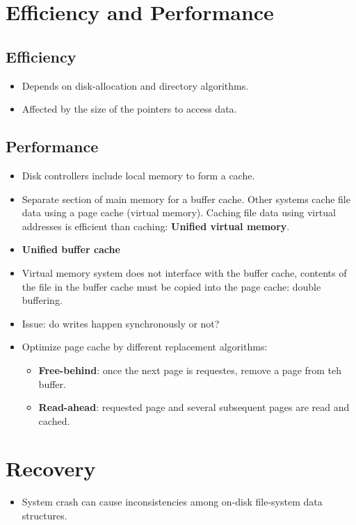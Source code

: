 \documentclass[10pt]{report}
\begin{document}
	\section{Efficiency and Performance}
		\subsection{Efficiency}
			\begin{itemize}
				\item Depends on disk-allocation and directory algorithms.
				\item Affected by the size of the pointers to access data.
			\end{itemize}

		\subsection{Performance}
			\begin{itemize}
				\item Disk controllers include local memory to form a cache.
				\item Separate section of main memory for a buffer cache. Other systems cache file data using a page cache (virtual memory). Caching file data using virtual addresses is efficient than caching: \textbf{Unified virtual memory}.
				\item \textbf{Unified buffer cache}
				\item Virtual memory system does not interface with the buffer cache, contents of the file in the buffer cache must be copied into the page cache: double buffering.
				\item Issue: do writes happen synchronously or not?
				\item Optimize page cache by different replacement algorithms:
				\begin{itemize}
					\item \textbf{Free-behind}: once the next page is requestes, remove a page from teh buffer.
					\item \textbf{Read-ahead}: requested page and several subsequent pages are read and cached.
				\end{itemize}
			\end{itemize}

	\section{Recovery}
		\begin{itemize}
			\item System crash can cause inconsistencies among on-disk file-system data structures.
		\end{itemize}
\end{document}
